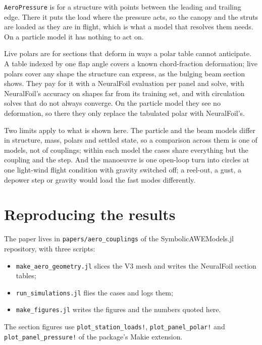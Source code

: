 \documentclass[11pt,a4paper]{article}
\newcommand{\code}[1]{\texttt{#1}}
\begin{document}
\code{AeroPressure} is for a structure with points between the leading and trailing edge. There it puts the load where the pressure acts, so the canopy and the struts are loaded as they are in flight, which is what a model that resolves them needs. On a particle model it has nothing to act on.

Live polars are for sections that deform in ways a polar table cannot anticipate. A table indexed by one flap angle covers a known chord-fraction deformation; live polars cover any shape the structure can express, as the bulging beam section shows. They pay for it with a NeuralFoil evaluation per panel and solve, with NeuralFoil's accuracy on shapes far from its training set, and with circulation solves that do not always converge. On the particle model they see no deformation, so there they only replace the tabulated polar with NeuralFoil's.

Two limits apply to what is shown here. The particle and the beam models differ in structure, mass, polars and settled state, so a comparison across them is one of models, not of couplings; within each model the cases share everything but the coupling and the step. And the manoeuvre is one open-loop turn into circles at one light-wind flight condition with gravity switched off; a reel-out, a gust, a depower step or gravity would load the fast modes differently.

\section{Reproducing the results}

The paper lives in \code{papers/aero\_couplings} of the SymbolicAWEModels.jl repository, with three scripts:
\begin{itemize}
  \item \code{make\_aero\_geometry.jl} slices the V3 mesh and writes the NeuralFoil section tables;
  \item \code{run\_simulations.jl} flies the cases and logs them;
  \item \code{make\_figures.jl} writes the figures and the numbers quoted here.
\end{itemize}
The section figures use \code{plot\_station\_loads!}, \code{plot\_panel\_polar!} and \code{plot\_panel\_pressure!} of the package's Makie extension.



\end{document}

